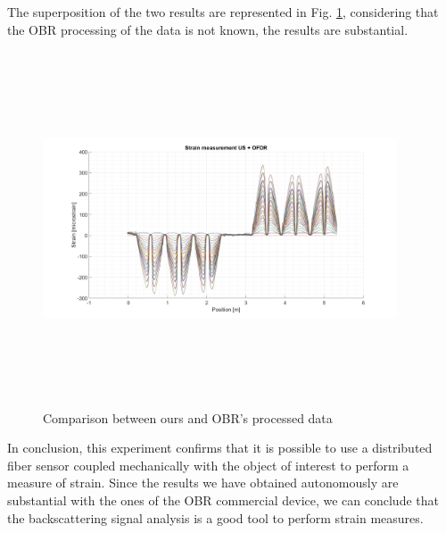 The superposition of the two results are represented in Fig. \ref{fig:sovrapposizione}, considering that the OBR processing of the data is not known, the results are substantial.

\begin{figure}[H]
	\centering
	\includegraphics[height=10.5cm, width=10.5cm, keepaspectratio]{img/sovrapposizione.png}
	\caption{Comparison between ours and OBR's processed data }\label{fig:sovrapposizione}
\end{figure}

In conclusion, this experiment confirms that it is possible to use a distributed fiber sensor coupled mechanically with the object of interest to perform a measure of strain. Since the results we have obtained autonomously are substantial with the ones of the OBR commercial device, we can conclude that the backscattering signal analysis is a good tool to perform strain measures.





